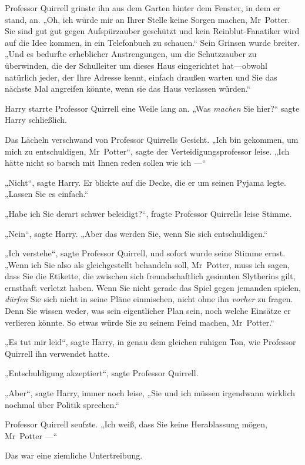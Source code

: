 {Professor Quirrell grinste ihn aus dem Garten hinter dem Fenster, in dem er stand, an. „Oh, ich würde mir an Ihrer Stelle keine Sorgen machen, Mr~Potter. Sie sind gut gut gegen Aufspürzauber geschützt und kein Reinblut-Fanatiker wird auf die Idee kommen, in ein Telefonbuch zu schauen.“ Sein Grinsen wurde breiter. „Und es bedurfte erheblicher Anstrengungen, um die Schutzzauber zu überwinden, die der Schulleiter um dieses Haus eingerichtet hat—obwohl natürlich jeder, der Ihre Adresse kennt, einfach draußen warten und Sie das nächste Mal angreifen könnte, wenn sie das Haus verlassen würden.“

Harry starrte Professor Quirrell eine Weile lang an. „Was \emph{machen} Sie hier?“ sagte Harry schließlich.

Das Lächeln verschwand von Professor Quirrells Gesicht. „Ich bin gekommen, um mich zu entschuldigen, Mr~Potter“, sagte der Verteidigungsprofessor leise. „Ich hätte nicht so barsch mit Ihnen reden sollen wie ich —“

„Nicht“, sagte Harry. Er blickte auf die Decke, die er um seinen Pyjama legte. „Lassen Sie es einfach.“

„Habe ich Sie derart schwer beleidigt?“, fragte Professor Quirrells leise Stimme.

„Nein“, sagte Harry. „Aber das werden Sie, wenn Sie sich entschuldigen.“

„Ich verstehe“, sagte Professor Quirrell, und sofort wurde seine Stimme ernst. „Wenn ich Sie also als gleichgestellt behandeln soll, Mr~Potter, muss ich sagen, dass Sie die Etikette, die zwischen sich freundschaftlich gesinnten Slytherins gilt, ernsthaft verletzt haben. Wenn Sie nicht gerade das Spiel gegen jemanden spielen, \emph{dürfen} Sie sich nicht in seine Pläne einmischen, nicht ohne ihn \emph{vorher} zu fragen. Denn Sie wissen weder, was sein eigentlicher Plan sein, noch welche Einsätze er verlieren könnte. So etwas würde Sie zu seinem Feind machen, Mr~Potter.“

„Es tut mir leid“, sagte Harry, in genau dem gleichen ruhigen Ton, wie Professor Quirrell ihn verwendet hatte.

„Entschuldigung akzeptiert“, sagte Professor Quirrell.

„Aber“, sagte Harry, immer noch leise, „Sie und ich müssen irgendwann wirklich nochmal über Politik sprechen.“

Professor Quirrell seufzte. „Ich weiß, dass Sie keine Herablassung mögen, Mr~Potter —“

Das war eine ziemliche Untertreibung.

}
